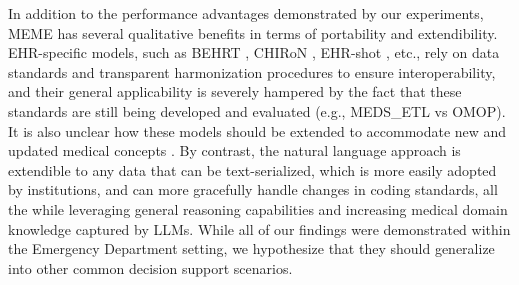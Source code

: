 \documentclass[pmlr]{jmlr}%
\begin{document}
{{In addition to the performance advantages demonstrated by our experiments, MEME has several qualitative benefits in terms of portability and extendibility. EHR-specific models, such as BEHRT \citep{li_behrt_2020}, CHIRoN \citep{hill2023chiron}, EHR-shot \citep{wornow2024ehrshot}, etc., rely on data standards and transparent harmonization procedures to ensure interoperability, and their general applicability is severely hampered by the fact that these standards are still being developed and evaluated (e.g., MEDS\_ETL vs OMOP). It is also unclear how these models should be extended to accommodate new and updated medical concepts \citep{arnrich2024medical}. By contrast, the natural language approach is extendible to any data that can be text-serialized, which is more easily adopted by institutions, and can more gracefully handle changes in coding standards, all the while leveraging general reasoning capabilities and increasing medical domain knowledge captured by LLMs. While all of our findings were demonstrated within the Emergency Department setting, we hypothesize that they should generalize into other common decision support scenarios.}




}
\end{document}
